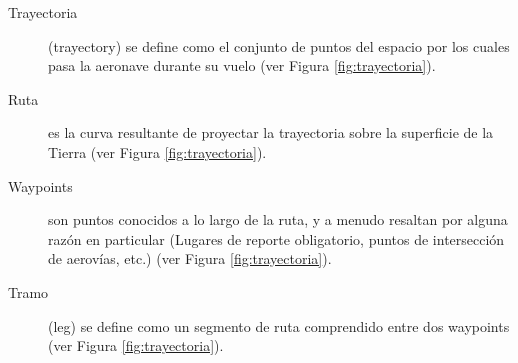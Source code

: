 \begin{description}

\item [Trayectoria] (trayectory) se define como el conjunto de puntos del espacio por los cuales pasa la aeronave durante su vuelo (ver Figura \ref{fig:trayectoria}).

\item [Ruta] es la curva resultante de proyectar la trayectoria sobre la superficie de la Tierra (ver Figura \ref{fig:trayectoria}).

\item [Waypoints] son puntos conocidos a lo largo de la ruta, y a menudo resaltan por alguna raz\'on en particular (Lugares de reporte obligatorio, puntos de intersecci\'on de aerov\'ias, etc.) (ver Figura \ref{fig:trayectoria}).

\item [Tramo] (leg) se define como un segmento de ruta comprendido entre dos waypoints (ver Figura \ref{fig:trayectoria}). 

\begin{figure}[!h]
  \centering


\end{figure}
\end{description}
